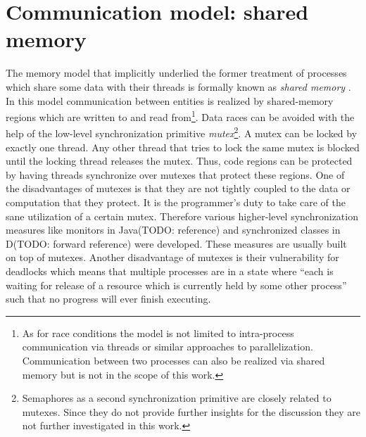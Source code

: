 \section{Communication model: shared memory}
The memory model that implicitly underlied the former treatment of processes which share some data with their threads is formally known as \textit{shared memory} . In this model communication between entities is realized by shared-memory regions which are written to and read from\cite[p.~138]{OperatingSystems_by_Haldar}\footnote{As for race conditions the model is not limited to intra-process communication via threads or similar approaches to parallelization. Communication between two processes can also be realized via shared memory but is not in the scope of this work.}. Data races can be avoided with the help of the low-level synchronization primitive \textit{mutex}\footnote{Semaphores as a second synchronization primitive are closely related to mutexes. Since they do not provide further insights for the discussion they are not further investigated in this work.}. A mutex can be locked by exactly one thread. Any other thread that tries to lock the same mutex is blocked until the locking thread releases the mutex\cite{AdvancedLinuxProgramming}. Thus, code regions can be protected by having threads synchronize over mutexes that protect these regions. One of the disadvantages of mutexes is that they are not tightly coupled to the data or computation that they protect. It is the programmer's duty to take care of the sane utilization of a certain mutex. Therefore various higher-level synchronization measures like monitors in Java(TODO:  reference) and synchronized classes in D(TODO: forward reference) were developed. These measures are usually built on top of mutexes\cite[p.~25]{TamingJavaThreads}. Another disadvantage of mutexes is their vulnerability for deadlocks which means that multiple processes are in a state where ``each is waiting for release of a resource which is currently held by some other process''\cite[p.~119]{IntroductionToOperatingSystems} such that no progress will ever finish executing\cite[p.~2-3]{OperatingSystems_by_Dhotre}.


